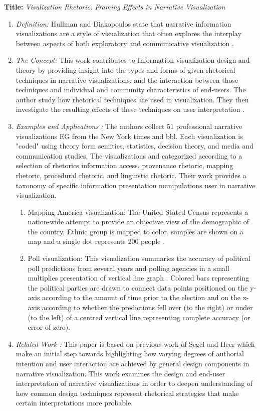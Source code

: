 \documentclass{egpubl}
\begin{document}
\textbf{Title:} \textit{Visulization Rhetoric: Framing Effects in Narrative Visualization}
\begin{enumerate}
\item \textit{Definition:} Hullman and Diakopoulos state that narrative information visualizations are a style of visualization that often explores the interplay between aspects of both exploratory and communicative visualization \cite{hullman}.
\item \textit{The Concept:} This work contributes to Information visualization  design and theory by providing insight into the types and forms of given rhetorical techniques in narrative visualizations, and the interaction between those techniques and individual and community characteristics of end-users. The author study how rhetorical techniques are used in visualization. They then investigate the resulting effects of these techniques on user interpretation \cite{hullman}.
\item  \textit{Examples and Applications :} 
The authors collect 51 professional narrative visualizations EG from the New York times and bbl. Each visualization is "coded" using theory form semitics, statistics, decision theory, and media and communication studies. The visualizations and categorized according to a selection of rhetorics information access, provenance rhetoric, mapping rhetoric, procedural rhetoric, and linguistic rhetoric. Their work provides a taxonomy of specific information presentation manipulations user in narrative visualization.
\begin{enumerate}
\item Mapping America visualization: The United Stated Census represents a nation-wide attempt to provide an objective view of the demographic of the country. Ethnic group is mapped to color, samples are shown on a map and a single dot represents 200 people \cite{Bloch}.
\item Poll visualization: This visualization summaries the accuracy of political poll predictions from several years and polling agencies in a small multiplies presentation of vertical line graph \cite{McCandless}. Colored bars representing the political parties are drawn to connect data points positioned on the y-axis according to the amount of time prior to the election and on the x-axis according to whether the predictions fell over (to the right) or under (to the left) of a centred vertical line representing complete accuracy (or error of zero). 
\end{enumerate}
\item \textit{Related Work :} This paper is based on previous work of Segel and Heer \cite{Heer1} which make an initial step towards highlighting how varying degrees of authorial intention and user interaction are achieved by general design components in narrative visualization. This work examines the design and end-user interpretation of narrative visualizations in order to deepen understanding of how common design techniques represent rhetorical strategies that make certain interpretations more probable.

\end{enumerate}
\end{document}

